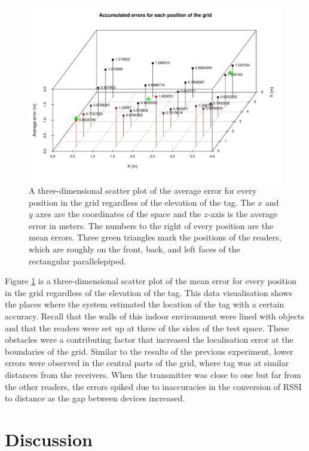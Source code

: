 \begin{figure}[H]
	\begin{center}
		\includegraphics[width=1\textwidth]{figures/tall2}
		\caption{A three-dimensional scatter plot of the average error for every position in the grid regardless of the elevation of the tag. The $x$ and $y$ axes are the coordinates of the space and the $z$-axis is the average error in meters. The numbers to the right of every position are the mean errors. Three green triangles mark the positions of the readers, which are roughly on the front, back, and left faces of the rectangular parallelepiped.}
		\label{fig:errortall}
	\end{center}
\end{figure}

Figure \ref{fig:errortall} is a three-dimensional scatter plot of the mean error for every position in the grid regardless of the elevation of the tag. This data visualisation shows the places where the system estimated the location of the tag with a certain accuracy. Recall that the walls of this indoor environment were lined with objects and that the readers were set up at three of the sides of the test space. These obstacles were a contributing factor that increased the localisation error at the boundaries of the grid. Similar to the results of the previous experiment, lower errors were observed in the central parts of the grid, where tag was at similar distances from the receivers. When the transmitter was close to one but far from the other readers, the errors spiked due to inaccuracies in the conversion of RSSI to distance as the gap between devices increased.


\section{Discussion}


